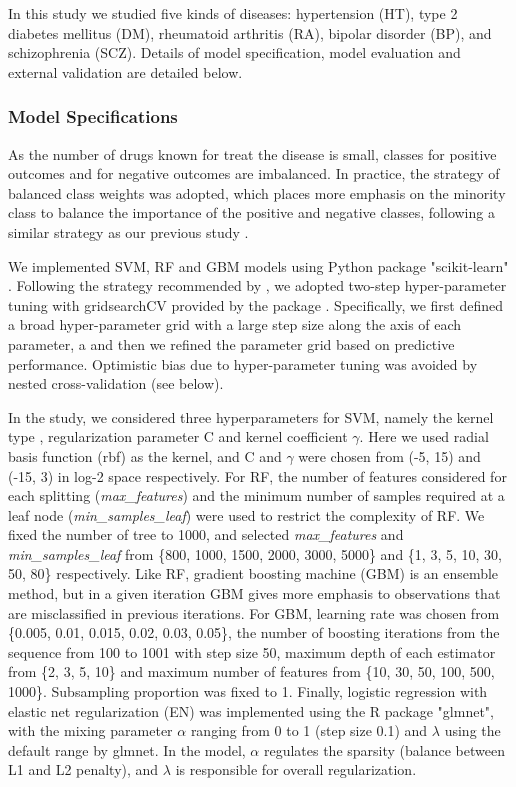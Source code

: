    In this study we studied five kinds of diseases: hypertension (HT), type 2 diabetes mellitus (DM), rheumatoid arthritis (RA), bipolar disorder (BP), and schizophrenia (SCZ). Details of model specification, model evaluation and external validation are detailed below. 

    \subsubsection{Model Specifications}
      As the number of drugs known for treat the disease is small, classes for positive outcomes and for negative outcomes are imbalanced. In practice, the strategy of balanced class weights was adopted, which places more emphasis on the minority class to balance the importance of the positive and negative classes, following a similar strategy as our previous study \cite{zhao2018drug}. 
      
      We implemented SVM, RF and GBM models using Python package "scikit-learn" \cite{pedregosa2011scikit}. Following the strategy recommended by \cite{hsu2003practical}, we adopted two-step hyper-parameter tuning with gridsearchCV provided by the package \cite{pedregosa2011scikit}.  Specifically, we first defined a broad hyper-parameter grid with a large step size along the axis of each parameter, a and then we refined the parameter grid based on predictive performance. Optimistic bias due to hyper-parameter tuning was avoided by nested cross-validation (see below).
   
      In the study, we considered three hyperparameters for SVM, namely the kernel type , regularization parameter C and kernel coefficient $\gamma$. Here we used radial basis function (rbf) as the kernel, and C and $\gamma$ were chosen from (-5, 15) and (-15, 3) in log-2 space respectively. For RF, the number of features considered for each splitting (\textit{max\_features}) and the minimum number of samples required at a leaf node (\textit{min\_samples\_leaf}) were used to restrict the complexity of RF. We fixed the number of tree to 1000, and selected \textit{max\_features} and \textit{min\_samples\_leaf} from \{800, 1000, 1500, 2000, 3000, 5000\} and \{1, 3, 5, 10, 30, 50, 80\} respectively. Like RF, gradient boosting machine (GBM) is an ensemble method, but in a given iteration GBM gives more emphasis to observations that are misclassified in previous iterations.  For GBM, learning rate was chosen from \{0.005, 0.01, 0.015, 0.02, 0.03, 0.05\}, the number of boosting iterations from the sequence from 100 to 1001 with step size 50, maximum depth of each estimator from \{2, 3, 5, 10\} and maximum number of features from \{10, 30, 50, 100, 500, 1000\}. Subsampling proportion was fixed to 1. Finally, logistic regression with elastic net regularization (EN) was implemented using the R package "glmnet", with the mixing parameter $\alpha$ ranging from 0 to 1 (step size 0.1) and $\lambda$ using the default range by glmnet. In the model, $\alpha$ regulates the sparsity (balance between L1 and L2 penalty), and $\lambda$ is responsible for overall regularization. 
  
